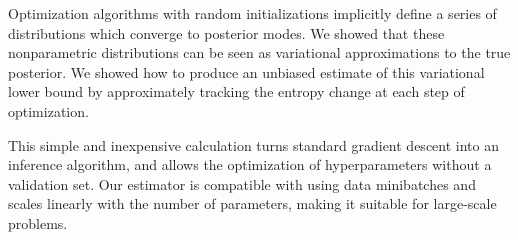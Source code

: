 \documentclass[]{article}
\begin{document}
Optimization algorithms with random initializations implicitly define a series of distributions which converge to posterior modes.
We showed that these nonparametric distributions can be seen as variational approximations to the true posterior. %
We showed how to produce an unbiased estimate of this variational lower bound by approximately tracking the entropy change at each step of optimization.

This simple and inexpensive calculation turns standard gradient descent into an inference algorithm, and allows the optimization of hyperparameters without a validation set.
Our estimator is compatible with using data minibatches and scales linearly with the number of parameters, making it suitable for large-scale problems.




\end{document}
